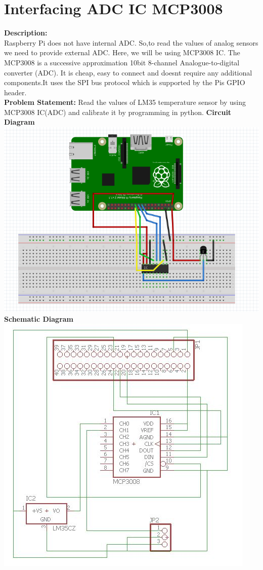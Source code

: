 \documentclass[a4paper,12pt,oneside]{book}
\begin{document}
\section{Interfacing ADC IC MCP3008}
\textbf{Description:} \\
Raspberry Pi does not have internal ADC. So,to read the values of analog sensors 
we need to provide external ADC. Here, we will be using MCP3008 IC. 
The MCP3008 is a successive approximation 10bit 8-channel Analogue-to-digital 
converter (ADC). It is cheap, easy to connect and doesnt require any additional 
components.It uses the SPI bus protocol which is supported by the Pis GPIO 
header.\\
\textbf{Problem Statement:}
Read the values of LM35 temperature sensor by using MCP3008 IC(ADC) and calibrate
it by programming in python.
\textbf{Circuit Diagram}\\
\centering 
\includegraphics[scale=0.4]{lm35_interfacing}
\flushleft
\textbf{Schematic Diagram}\\
\centering
\includegraphics[scale=0.4]{adc_schematic}
\end{document}
